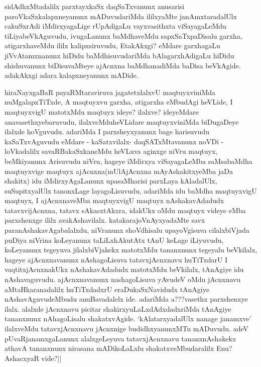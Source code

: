 \begin{artha}
sidAdhxMtadalilx parxtayxkaSx daqSaTxvanunx anusarisi paroVkaSxkalapxneyanunx mADuvudariMda ililxyaMte janAmxtaradalUlx cakuSxrAdi iMdirxyagaLige rUpAdigaLu vayxvasithxta viSayagaLeMdu tiLiyabeVkAguvudu, ivugaLanunx baMdhaveMdu sapxSaTxpaDisalu garxha, atigarxhaveMdu ililx kalipxsiruvudu, EtakAkxgi? eMdare garxhagaLu jiVvAtamxnanunx hiDidu baMdhisuvudariMda bAlagarxhAdigaLu hiDidu shishuvanunx biDisuvaMteye ajAcnxna baMdhanadiMda baDisa beVkAgide. adakAkxgi adara kalapxneyanunx mADide. 
\end{artha}

\begin{center}
\end{center}

\begin{artha}
hiraNayxgaBaR payaRMtaraviruva jagatetxlalxvU maqtuyxviniMda nuMgalapxTiTxde, A maqtuyxvu garxha, atigarxha eMbudAgi heVLide, I maqtuyxvigU matotxMdu maqtuyx ideye? ilalxve? ideyeMdare anavasethxyebaruvudu, ilalxveMduheVLidare maqtuyxviniMda biDugaDeye ilalxde hoVguvudu. adariMda I parxsheyxyanunx bage harisuvudu kaSaTxvAguvudu eMdare - kaSatxvilalx- daqSATxMtavanunx noVDi - loVkadalilx savaRBakaSxkaneMdu heVLuva aginxge niVru maqtuyx, beMkiyanunx Arisuvudu niVru, hageye iMdirxya viSayagaLeMba saMsabaMdha maqtuyxvige maqtuyx ajAcnxna(mUlAjAcnxna mAyAshakitxyeMba jaDa shakitx) idu iMdirxyAgaLanunx upasaMharisi parxLaya kAladalUlx, suSupitxyalUlx tanonxLage layagoLisuvudu, adariMda idu baMdha maqtuyxvigU maqtuyx, I ajAcnxnaveMba maqtuyxvigU maqtuyx nAshakavAdadudx tatavxvijAcnxna, tatavx sAkasxtAkxra, idakUkx oMdu maqtuyx videye eMba parxshenxge ililx avakAshavilalx. katakarajoVnAyxyadaMte savx paranAshakavAgabalalxdu, niVranunx shoVdhisalu upayoVgisuva cilalxbiVjada puDiya niVrina koLeyanunx taLiLxhAkutAtx tAnU keLage iLiyuvudu, koLeyanunx tegeyuva jilalxbiVjakekx matotxMdu tananxnunx tegeyalu beVkilalx, hageye ajAcnxnavanunx nAshagoLisuva tatavxjAcnxnavu huTiTxdarU I vaqtitxjAcnxnakUkx nAshakavAdadudx matotxMdu beVkilalx, tAnAgiye idu nAshavaguvudu. ajAcnxnavanunx nashagoLisuva yAvudeV oMdu jAcnxnavu aMtaHkaranadalilx huTiTxdadxrU eraDukaSxNavidudx tAnAgiye nAshavAguvudeMbudu anuBavadalelx ide. adariMda a???vasethx parxshenxye ilalx. alalxde jAcnxnavu picitar shakirxyuLaLxdAdxdadxriMda tAnAgiye tananxnunx nAhagoLisalu shakatxvAgide. `kAlatarxyadalUlx nanage janamxve' ilalxveMdu tatavxjAcnxnavu jAcnxnige budidhxyanunxMTu mADuvudu. adeV pUvaRjanamxgaLanunx alalxgeLeyuva tatavxjAcnxnavu tananxnAshakekx athavA tananxnunx nirasana mADikoLaLxlu shakatxveMbudaralilx Enu? AshacxyaR vide?||
\end{artha}

